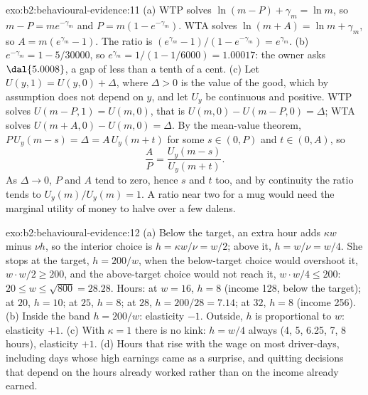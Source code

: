 \begin{solution}{exo:b2:behavioural-evidence:11}
(a) WTP solves $\ln(m - P) + \gamma_m = \ln m$, so $m - P = me^{-\gamma_m}$ and $P = m(1 - e^{-\gamma_m})$.
WTA solves $\ln(m + A) = \ln m + \gamma_m$, so $A = m(e^{\gamma_m} - 1)$. The ratio is $(e^{\gamma_m} -
1)/(1 - e^{-\gamma_m}) = e^{\gamma_m}$.
(b) $e^{-\gamma_m} = 1 - 5/30000$, so $e^{\gamma_m} = 1/(1 - 1/6000) = 1.00017$: the owner asks
$\dal{5.0008}$, a gap of less than a tenth of a cent.
(c) Let $U(y, 1) = U(y, 0) + \Delta$, where $\Delta > 0$ is the value of the good, which by assumption
does not depend on $y$, and let $U_y$ be continuous and positive. WTP solves $U(m - P, 1) = U(m, 0)$, that
is $U(m, 0) - U(m - P, 0) = \Delta$; WTA solves $U(m + A, 0) - U(m, 0) = \Delta$. By the mean-value
theorem, $P\,U_y(m - s) = \Delta = A\,U_y(m + t)$ for some $s \in (0, P)$ and $t \in (0, A)$, so
\[
\frac{A}{P} = \frac{U_y(m - s)}{U_y(m + t)}.
\]
As $\Delta \to 0$, $P$ and $A$ tend to zero, hence $s$ and $t$ too, and by continuity the ratio tends to
$U_y(m)/U_y(m) = 1$. A ratio near two for a mug would need the marginal utility of money to halve over a
few dalens.
\end{solution}

\begin{solution}{exo:b2:behavioural-evidence:12}
(a) Below the target, an extra hour adds $\kappa w$ minus $\nu h$, so the interior choice is $h = \kappa
w/\nu = w/2$; above it, $h = w/\nu = w/4$. She stops at the target, $h = 200/w$, when the below-target
choice would overshoot it, $w \cdot w/2 \ge 200$, and the above-target choice would not reach it, $w \cdot
w/4 \le 200$: $20 \le w \le \sqrt{800} = 28.28$. Hours: at $w = 16$, $h = 8$ (income 128, below the
target); at $20$, $h = 10$; at $25$, $h = 8$; at $28$, $h = 200/28 = 7.14$; at $32$, $h = 8$ (income 256).
(b) Inside the band $h = 200/w$: elasticity $-1$. Outside, $h$ is proportional to $w$: elasticity $+1$.
(c) With $\kappa = 1$ there is no kink: $h = w/4$ always (4, 5, 6.25, 7, 8 hours), elasticity $+1$.
(d) Hours that rise with the wage on most driver-days, including days whose high earnings came as a
surprise, and quitting decisions that depend on the hours already worked rather than on the income
already earned.
\end{solution}

